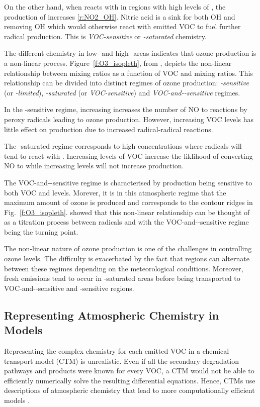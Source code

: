 On the other hand, when  reacts with  in regions with high levels of , the production of  increases \eqref{r:NO2_OH}.
Nitric acid is a sink for both OH and  removing OH which would otherwise react with emitted VOC to fuel further radical production.
This is \emph{VOC-sensitive} or \emph{-saturated} chemistry.

The different chemistry in low- and high- areas indicates that ozone production is a non-linear process.
Figure~\ref{f:O3_isopleth}, from \citet{Jenkin:2000}, depicts the non-linear relationship between  mixing ratios as a function of VOC and  mixing ratios.  
This relationship can be divided into distinct regimes of ozone production: \emph{-sensitive} (or \emph{-limited}), \emph{-saturated} (or \emph{VOC-sensitive}) and \emph{VOC-and--sensitive} regimes. 

In the -sensitive regime, increasing  increases the number of NO to  reactions by peroxy radicals leading to ozone production.
However, increasing VOC levels has little effect on  production due to increased radical-radical reactions.

The -saturated regime corresponds to high  concentrations where radicals will tend to react with . 
Increasing levels of VOC increase the liklihood of  converting NO to  while increasing  levels will not increase  production.

The VOC-and--sensitive regime is characterised by  production being sensitive to both VOC and  levels. 
Morever, it is in this atmospheric regime that the maximum amount of ozone is produced and corresponds to the contour ridges in Fig.~\ref{f:O3_isopleth}.
\citet{Kleinman:1994} showed that this non-linear relationship can be thought of as a titration process between radicals and  with the VOC-and--sensitive regime being the turning point.

The non-linear nature of ozone production is one of the challenges in controlling ozone levels.
The difficulty is exacerbated by the fact that regions can alternate between these regimes depending on the meteorological conditions.
Moreover, fresh emissions tend to occur in -saturated areas before being transported to VOC-and--sensitive and -sensitive regions.

\subsection{Representing Atmospheric Chemistry in Models} \label{ss:chemistry_models}
Representing the complex chemistry for each emitted VOC in a chemical transport model (CTM) is unrealistic.
Even if all the secondary degradation pathways and products were known for every VOC, a CTM would not be able to efficiently numerically solve the resulting differential equations.
Hence, CTMs use descriptions of atmospheric chemistry that lead to more computationally efficient models \citep{Stockwell:2012}.


